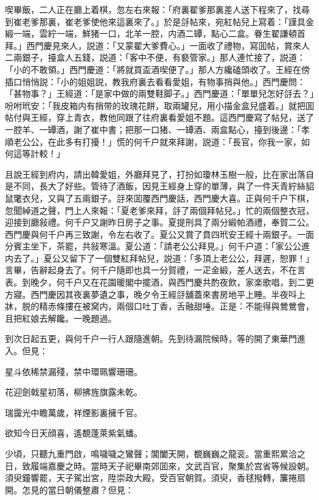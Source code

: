 喫畢飯，二人正在廳上着棋，忽左右來報：「府裏翟爹那裏差人送下程來了，找尋到崔老爹那裏，崔老爹使他來這裏來了。」於是㧱帖來，宛紅帖兒上寫着：「謹具金緞一端，雲紵一端，鮮猪一口，北羊一腔，内酒二罈，點心二盒。眷生翟謙頓首拜。」西門慶見來人，説道：「又蒙翟大爹費心。」一面收了禮物，寫囬帖，賞來人二兩銀子，擡盒人五錢，説道：「客中不便，有褻管家。」那人連忙接了，説道：「小的不敢領。」西門慶道：「將就買盃酒喫便了。」那人方纔磕頭收了。王經在傍插口悄悄説：「小的姐姐説，教我府裏去看看愛姐，有物事捎與他。」西門慶問：「甚物事？」王經道：「是家中做的兩雙鞋脚子。」西門慶道：「單單兒怎好㧱去？」吩咐玳安：「我皮箱内有捎带的玫瑰花餅，取兩罐兒，用小描金盒兒盛着。」就把囬帖付與王經，穿上青衣，教他同跟了往府裏看愛姐不題。這西門慶寫了帖兒，送了一腔羊、一罈酒，謝了崔中書；把那一口猪、一罈酒、兩盒點心，擡到後邊：「孝順老公公，在此多有打擾！」慌的何千户就來拜謝，説道：「長官，你我一家，如何這等計較！」

且說王經到府内，請出韓愛姐，外廳拜見了，打扮如瓊林玉樹一般，比在家出落自是不同，長大了好些。管待了酒飯，因見王經身上穿的單薄，與了一件天青紵絲貂鼠氅衣兒，又與了五兩銀子。㧱來囬覆西門慶話，西門慶大喜。正與何千户下棋，忽聞綽道之聲，門上人來報：「夏老爹來拜，㧱了兩個拜帖兒。」忙的兩個整衣冠，迎接到廳敍禮。何千户又謝昨日房子之事。夏提刑具了兩分緞帕酒禮，奉賀二公。西門慶與何千户再三致謝，令左右收了。夏公又賞了賁四玳安王經十兩銀子。一面分賓主坐下，茶罷，共敍寒溫。夏公道：「請老公公拜見。」何千户道：「家公公進内去了。」夏公又留下了一個雙紅拜帖兒，説道：「多頂上老公公，拜遲，恕罪！」言畢，告辭起身去了。何千户隨即也具一分賀禮，一疋金緞，差人送去，不在言表。到晚夕，何千户又在花園暖閣中擺酒，與西門慶共酌夜飲，家楽歌唱，到二更方寢。西門慶因其夜裏夢遺之事，晚夕令王經㧱舖蓋來書房地平上睡。半夜呌上牀，脱的精赤條摟在被窝内，兩個口吐丁香，舌融甜唾。正是：不能得與鶯鶯會，且把紅娘去解饞。一晚題過。

到次日起五更，與何千户一行人跟隨進朝。先到待漏院候時，等的開了東華門進入。但見：

\begin{myquote}
星斗依稀禁漏殘，禁中環珮響珊珊。

花迎劍戟星初落，柳拂旌旗露未乾。

瑞靄光中瞻萬歲，祥煙影裏擁千官。

欲知今日天顔喜，遙覩蓬萊紫氣蟠。
\end{myquote}

少頃，只聽九重門啟，鳴噦噦之鸞聲；閶闔天開，覩巍巍之龍衮。當重熙累洽之日，致履端嘉慶之時。當時天子祀畢南郊囬來，文武百官，聚集於宫省等候設朝。須臾鐘響罷，天子駕出宮，陞崇政大殿，受百官朝賀。須臾，香毬撥轉，簾捲扇開。怎見的當日朝儀整肅？但見：

